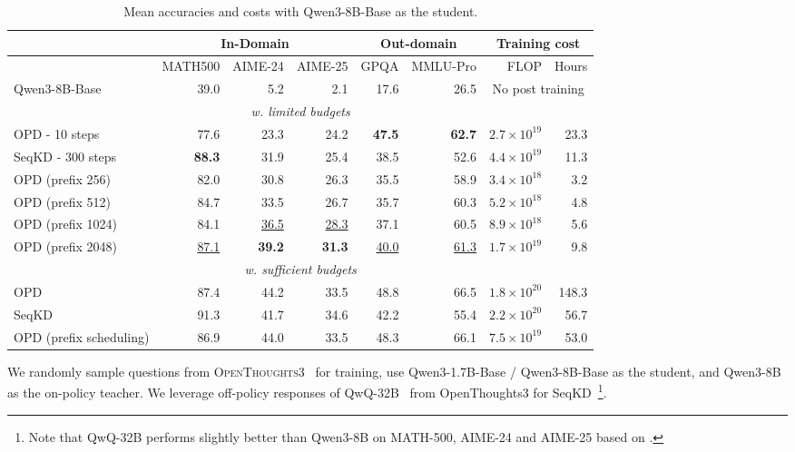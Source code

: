 \documentclass[11pt]{article}
\begin{document}
\begin{table}[h!]  
\centering  
\small  
\begin{tabular}{l|r|r|r||r|r||r|r}  
\hline  
 & \multicolumn{3}{c||}{In-Domain}   & \multicolumn{2}{c||}{Out-domain} &\multicolumn{2}{c}{Training cost}  \\ 
\hline  
 & {\scriptsize MATH500} & {\scriptsize AIME-24} & {\scriptsize AIME-25}   & {\scriptsize GPQA} & {\scriptsize MMLU-Pro} & FLOP & Hours \\  

\hline  
Qwen3-8B-Base         & 39.0 &  5.2  & 2.1 & 17.6 & 26.5 & \multicolumn{2}{c}{No post training}  \\  
\hline
\multicolumn{8}{c}{\emph{w. limited budgets}} \\
\hline
OPD - 10 steps       & 77.6 & 23.3 & 24.2  & \textbf{47.5} & \textbf{62.7} & $2.7\times 10^{19}$ & 23.3 \\  
SeqKD - 300 steps                      & \textbf{88.3} & 31.9 & 25.4 &  38.5 & 52.6 & $4.4\times 10^{19}$ & 11.3 \\  
\hline
\hline
OPD (prefix 256)      & 82.0  &  30.8 & 26.3  & 35.5 & 58.9 & $3.4\times 10^{18}$ & 3.2 \\  
OPD (prefix 512)      & 84.7 & 33.5  & 26.7 &  35.7 &  60.3 &$5.2\times 10^{18}$ & 4.8 \\  
OPD (prefix 1024)     &  84.1 &  \underline{36.5} & \underline{28.3}  & 37.1 & 60.5 & $8.9\times 10^{18}$  & 5.6 \\ 
OPD (prefix 2048)     & \underline{87.1}  &  \textbf{39.2} & \textbf{31.3}  & \underline{40.0} & \underline{61.3} & $1.7\times 10^{19}$  & 9.8 \\  

\hline
\hline
\multicolumn{8}{c}{\emph{w. sufficient budgets}} \\
\hline
OPD               & 87.4 &  44.2 & 33.5  & 48.8 & 66.5 & $1.8\times 10^{20}$ & 148.3 \\  
SeqKD                    & 91.3 &  41.7 & 34.6 & 42.2 & 55.4 & $2.2\times 10^{20}$ & 56.7 \\  
\hline
OPD (prefix scheduling)    & 86.9 & 44.0  &  33.5 & 48.3 & 66.1 & $7.5\times 10^{19}$  & 53.0 \\ 
\hline  
\end{tabular}  
\caption{Mean accuracies and costs with Qwen3-8B-Base as the student.}
\label{tab:main result}  
\end{table}  

We randomly sample questions from \textsc{OpenThoughts3}~\citep{guha2025openthoughts} for training, use Qwen3-1.7B-Base / Qwen3-8B-Base as the student, and Qwen3-8B as the on-policy teacher. We leverage off-policy responses of QwQ-32B~\cite{qwen2024qwq} from OpenThoughts3 for SeqKD~\footnote{Note that QwQ-32B performs slightly better than Qwen3-8B on MATH-500, AIME-24 and AIME-25 based on \citet{yang2025qwen3}. }.
\end{document}
